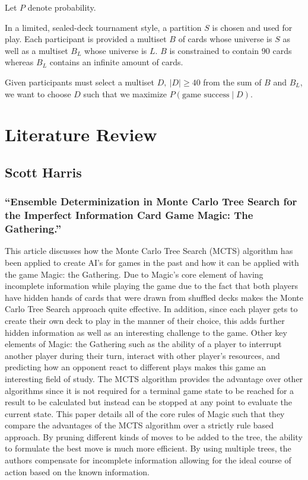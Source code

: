 \documentclass[12pt, letterpaper]{article}
\begin{document}
Let $ P $ denote probability.

In a limited, sealed-deck tournament style, a partition $ S $ is chosen and used for play.
Each participant is provided a multiset $ B $ of cards whose universe is $ S $
as well as a multiset $ B_L $ whose universe is $ L $.
$ B $ is constrained to contain $ 90 $ cards
whereas $ B_L $ contains an infinite amount of cards.

Given participants must select a multiset $ D, \ |D| \ge 40 $ from the sum of $ B $ and $ B_L $,
we want to choose $ D $ such that we maximize $ P(\text{game success} \mid D) $.

\section{Literature Review}

\subsection{Scott Harris}

\subsubsection{\enquote{Ensemble Determinization in Monte Carlo Tree Search for the Imperfect Information Card Game Magic: The Gathering.}}

This article discusses how the Monte Carlo Tree Search (MCTS) algorithm has been applied to create AI’s for games in the
past and how it can be applied with the game Magic: the Gathering. Due to Magic’s core element of having incomplete
information while playing the game due to the fact that both players have hidden hands of cards that were drawn from
shuffled decks makes the Monte Carlo Tree Search approach quite effective. In addition, since each player gets to
create their own deck to play in the manner of their choice, this adds further hidden information as well as an
interesting challenge to the game. Other key elements of Magic: the Gathering such as the ability of a player to
interrupt another player during their turn, interact with other player’s resources, and predicting how an opponent
react to different plays makes this game an interesting field of study. The MCTS algorithm provides the advantage over
other algorithms since it is not required for a terminal game state to be reached for a result to be calculated but
instead can be stopped at any point to evaluate the current state. This paper details all of the core rules of Magic
such that they compare the advantages of the MCTS algorithm over a strictly rule based approach. By pruning different
kinds of moves to be added to the tree, the ability to formulate the best move is much more efficient. By using multiple
trees, the authors compensate for incomplete information allowing for the ideal course of action based on the known
information.
\end{document}
